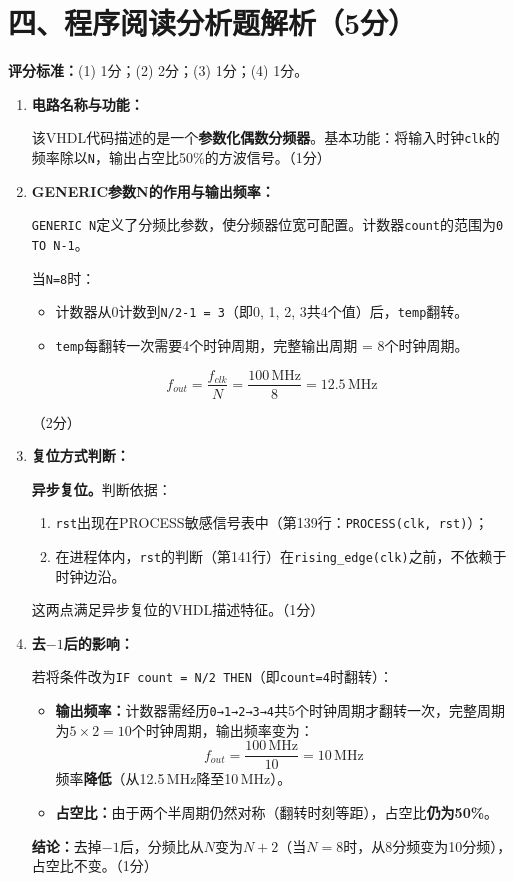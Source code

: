 \section{四、程序阅读分析题解析（5分）}

\begin{framed}
\textbf{评分标准：}(1) 1分；(2) 2分；(3) 1分；(4) 1分。
\end{framed}

\begin{enumerate}[label=(\arabic*)]

\item \textbf{电路名称与功能：}

该VHDL代码描述的是一个\textbf{参数化偶数分频器}。基本功能：将输入时钟\texttt{clk}的频率除以\texttt{N}，输出占空比50\%的方波信号。（1分）

\item \textbf{GENERIC参数N的作用与输出频率：}

\texttt{GENERIC N}定义了分频比参数，使分频器位宽可配置。计数器\texttt{count}的范围为\texttt{0 TO N-1}。

当\texttt{N=8}时：
\begin{itemize}
\item 计数器从0计数到\texttt{N/2-1 = 3}（即0, 1, 2, 3共4个值）后，\texttt{temp}翻转。
\item \texttt{temp}每翻转一次需要4个时钟周期，完整输出周期 = $8$个时钟周期。
\end{itemize}

$$f_{out} = \frac{f_{clk}}{N} = \frac{100\,\text{MHz}}{8} = 12.5\,\text{MHz}$$

（2分）

\item \textbf{复位方式判断：}

\textbf{异步复位。}判断依据：
\begin{enumerate}
\item \texttt{rst}出现在PROCESS敏感信号表中（第139行：\texttt{PROCESS(clk, rst)}）；
\item 在进程体内，\texttt{rst}的判断（第141行）在\texttt{rising\_edge(clk)}之前，不依赖于时钟边沿。
\end{enumerate}
这两点满足异步复位的VHDL描述特征。（1分）

\item \textbf{去$-1$后的影响：}

若将条件改为\texttt{IF count = N/2 THEN}（即\texttt{count=4}时翻转）：

\begin{itemize}
\item \textbf{输出频率：}计数器需经历\texttt{0→1→2→3→4}共5个时钟周期才翻转一次，完整周期为$5\times 2=10$个时钟周期，输出频率变为：
$$f_{out} = \frac{100\,\text{MHz}}{10} = 10\,\text{MHz}$$
频率\textbf{降低}（从12.5\,MHz降至10\,MHz）。

\item \textbf{占空比：}由于两个半周期仍然对称（翻转时刻等距），占空比\textbf{仍为50\%}。
\end{itemize}

\textbf{结论：}去掉$-1$后，分频比从$N$变为$N+2$（当$N=8$时，从8分频变为10分频），占空比不变。（1分）

\end{enumerate}


